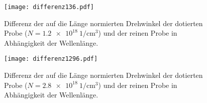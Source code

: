 \begin{figure}[H]
  \centering
  \texttt{[image: differenz136.pdf]}
  \caption{Differenz der auf die Länge normierten Drehwinkel der dotierten Probe ($N = \SI{1.2e18}{1\per\centi\meter^3}$) und der reinen Probe in Abhängigkeit der Wellenlänge.}
  \label{fig:differenz136}
\end{figure}

\begin{figure}[H]
  \centering
  \texttt{[image: differenz1296.pdf]}
  \caption{Differenz der auf die Länge normierten Drehwinkel der dotierten Probe ($N = \SI{2.8e18}{1\per\centi\meter^3}$) und der reinen Probe in Abhängigkeit der Wellenlänge.}
  \label{fig:differenz1296}
\end{figure}
